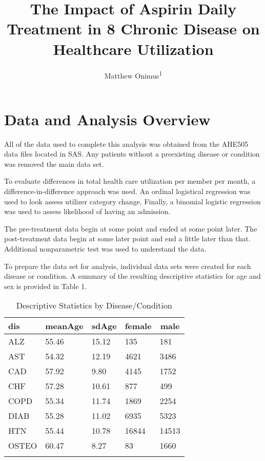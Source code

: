 \documentclass[
  english,
  man]{apa6}
\title{The Impact of Aspirin Daily Treatment in 8 Chronic Disease on Healthcare Utilization}
\author{Matthew Onimus\textsuperscript{1}}
\date{}
\affiliation{\vspace{0.5cm}\textsuperscript{1} Merck \& Co C/O Jefferson Univserity}
\begin{document}
\maketitle

\hypertarget{data-and-analysis-overview}{%
\section{Data and Analysis Overview}\label{data-and-analysis-overview}}

All of the data used to complete this analysis was obtained from the AHE505 data files located in SAS. Any patients without a preexisting disease or condition was removed the main data set.

To evaluate differences in total health care utilization per member per month, a difference-in-difference approach was used. An ordinal logistical regression was used to look assess utilizer category change. Finally, a binomial logistic regression was used to assess likelihood of having an admission.

The pre-treatment data begin at some point and ended at some point later. The post-treatment data begin at some later point and end a little later than that. Additional nonparametric test was used to understand the data.

To prepare the data set for analysis, individual data sets were created for each disease or condition. A summary of the resulting descriptive statistics for age and sex is provided in Table 1.

\begin{table}[tbp]

\begin{center}
\begin{threeparttable}

\caption{\label{tab:table1}Descriptive Statistics by Disease/Condition}

\begin{tabular}{lllll}
\toprule{}
dis & \multicolumn{1}{c}{meanAge} & \multicolumn{1}{c}{sdAge} & \multicolumn{1}{c}{female} & \multicolumn{1}{c}{male}\\
\midrule{}
ALZ & 55.46 & 15.12 & 135 & 181\\
AST & 54.32 & 12.19 & 4621 & 3486\\
CAD & 57.92 & 9.80 & 4145 & 1752\\
CHF & 57.28 & 10.61 & 877 & 499\\
COPD & 55.34 & 11.74 & 1869 & 2254\\
DIAB & 55.28 & 11.02 & 6935 & 5323\\
HTN & 55.44 & 10.78 & 16844 & 14513\\
OSTEO & 60.47 & 8.27 & 83 & 1660\\
\bottomrule{}
\end{tabular}

\end{threeparttable}
\end{center}

\end{table}
\end{document}
